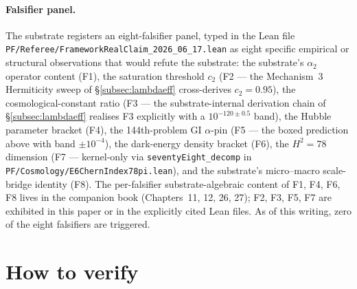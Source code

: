 \documentclass[11pt,a4paper]{amsart}
\theoremstyle{plain}
\theoremstyle{definition}
\begin{document}
\paragraph{Falsifier panel.} The substrate registers an eight-falsifier panel, typed in the Lean file \texttt{PF/Referee/FrameworkRealClaim\_2026\_06\_17.lean} as eight specific empirical or structural observations that would refute the substrate: the substrate's $\alpha_2$ operator content (F1), the saturation threshold $c_2$ (F2 --- the Mechanism~3 Hermiticity sweep of \S\ref{subsec:lambdaeff} cross-derives $c_2 = 0.95$), the cosmological-constant ratio (F3 --- the substrate-internal derivation chain of \S\ref{subsec:lambdaeff} realises F3 explicitly with a $10^{-120\pm 0.5}$ band), the Hubble parameter bracket (F4), the 144th-problem GI $\alpha$-pin (F5 --- the boxed prediction above with band $\pm 10^{-4}$), the dark-energy density bracket (F6), the $H^2 = 78$ dimension (F7 --- kernel-only via \texttt{seventyEight\_decomp} in \texttt{PF/Cosmology/E6ChernIndex78pi.lean}), and the substrate's micro--macro scale-bridge identity (F8). The per-falsifier substrate-algebraic content of F1, F4, F6, F8 lives in the companion book (Chapters~11, 12, 26, 27); F2, F3, F5, F7 are exhibited in this paper or in the explicitly cited Lean files. As of this writing, zero of the eight falsifiers are triggered.

\section{How to verify}\label{sec:verify}
\end{document}
